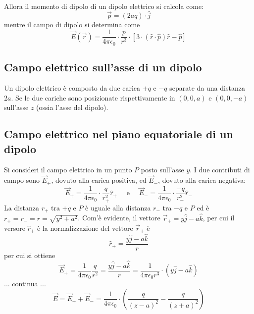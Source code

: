 \documentclass[a4paper]{extarticle}
\begin{document}

\vspace{1em}
\noindent
Allora il momento di dipolo di un dipolo elettrico si calcola come:
\[\vec p = (2aq) \cdot \hat{j}\]
mentre il campo di dipolo si determina come
\[\vec{E}(\vec{r}) = \frac{1}{4 \pi \epsilon_0} \cdot \frac{p}{r^3} \cdot \left[3 \cdot (\hat{r} \cdot \hat{p}) \hat{r} - \hat{p}\right]\]

\vspace{1em}
\noindent
\subsection{Campo elettrico sull'asse di un dipolo}
Un dipolo elettrico è composto da due carica $+q$ e $-q$ separate da una distanza $2a$. Se le due cariche sono posizionate rispettivamente in $(0,0,a)$ e $(0,0,-a)$ sull'asse $z$ (ossia l'asse del dipolo).\\

\vspace{1em}
\noindent
\subsection{Campo elettrico nel piano equatoriale di un dipolo}
Si consideri il campo elettrico in un punto $P$ posto sull'asse $y$. I due contributi di campo sono $\vec{E}_+$, dovuto alla carica positiva, ed $\vec{E}_-$, dovuto alla carica negativa:
\[\vec{E}_+ = \frac{1}{4 \pi \epsilon_0} \cdot \frac{q}{r_+^2} \hat{r}_+ \hspace{1em} \text{ e } \hspace{1em} \vec{E}_- = \frac{1}{4 \pi \epsilon_0} \cdot \frac{-q}{r_-^2} \hat{r}_-\]
La distanza $r_+$ tra $+q$ e $P$ è uguale alla distanza $r_-$ tra $-q$ e $P$ ed è $r_+ = r_- = r = \sqrt{y^2+a^2}$. Com'è evidente, il vettore $\vec{r}_+ = y \hat{j} - a \hat{k}$, per cui il versore $\hat{r}_+$ è la normalizzazione del vettore $\vec{r}_+$ è
\[\hat{r}_+=\frac{y \hat{j} - a \hat{k}}{r}\]
per cui si ottiene
\[\vec{E}_+=\frac{1}{4 \pi \epsilon_0} \frac{q}{r^2} = \frac{y \hat{j} - a \hat{k}}{r} = \frac{1}{4 \pi \epsilon_0 r^3} \cdot (y \hat{j} - a \hat{k})\]
... continua ...
\[\vec E = \vec{E}_+ + \vec{E}_- = \frac{1}{4 \pi \epsilon_0} \cdot \left(\frac{q}{(z-a)^2} - \frac{q}{(z+a)^2}\right)\]
\end{document}
